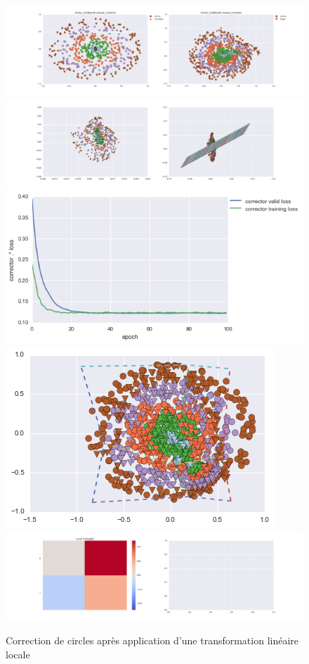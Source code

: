 \begin{figure}[H] %
\centering
\includegraphics[width=\linewidth]{fig/24-05-2016/circles/Circles_GridBendK-closest_Corrector-DATA.png}
\includegraphics[width=\linewidth]{fig/24-05-2016/circles/Circles_GridBendK-closest_Corrector-GridCheck.png}
\includegraphics[width=0.45\linewidth]{fig/24-05-2016/circles/Circles_GridBendK-closest_Corrector-Learning_curve.png}
\includegraphics[width=0.45\linewidth]{fig/24-05-2016/circles/circles_grid.png}
\includegraphics[width=\linewidth]{fig/24-05-2016/circles/Circles_GridBendK-closest_Corrector-W.png}
\caption{Correction de circles après application d'une transformation linéaire locale}
\label{fig:recap-circles-GridBend-exhaustive}
\end{figure}

